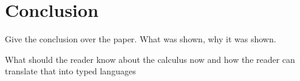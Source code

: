 \section{Conclusion}

Give the conclusion over the paper.
What was shown, why it was shown.

What should the reader know about the calculus now
and how the reader can translate that into typed languages











